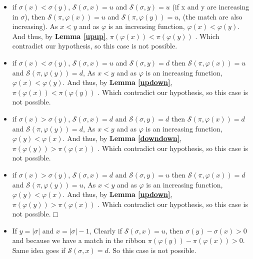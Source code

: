 \documentclass[12pt, a4paper]{article}
\newcommand{\ptext}{\pi}
\newcommand{\pmotif}{\sigma}
\newcommand{\dstep}{d}
\newcommand{\ustep}{u}
\begin{document}
		\begin{itemize}		
			\item if $\pmotif(x)<\pmotif(y)$, 
			$\mathcal{S}(\pmotif,x)=\ustep$ 
			and $\mathcal{S}(\pmotif,y)=\ustep$
			(if x and y are increasing in $\pmotif$),
			then $\mathcal{S}(\ptext,\varphi(x))=\ustep$ and $\mathcal{S}(\ptext,\varphi(y))=\ustep$,
			(the match are also increasing).
			As $x<y$ and as $\varphi$ is an increasing function, 
			$\varphi(x) < \varphi(y)$.
			And thus, by \textbf{Lemma \ref{upup}},
			$\ptext(\varphi(x)) < \ptext(\varphi(y))$ .
			Which contradict our hypothesis,
			so this case is not possible.
		
			\item if $\pmotif(x)<\pmotif(y)$, 
			$\mathcal{S}(\pmotif,x)=\ustep$ 
			and $\mathcal{S}(\pmotif,y)=\dstep$
			then $\mathcal{S}(\ptext,\varphi(x))=\ustep$ and $\mathcal{S}(\ptext,\varphi(y))=\dstep$,
			As $x<y$ and as $\varphi$ is an increasing function, 
			$\varphi(x) < \varphi(y)$.
			And thus, by \textbf{Lemma \ref{updown}},
			$\ptext(\varphi(x)) < \ptext(\varphi(y))$ .
			Which contradict our hypothesis,
			so this case is not possible.			

			\item if $\pmotif(x)>\pmotif(y)$, 
			$\mathcal{S}(\pmotif,x)=\dstep$ 
			and $\mathcal{S}(\pmotif,y)=\dstep$
			then $\mathcal{S}(\ptext,\varphi(x))=\dstep$ and $\mathcal{S}(\ptext,\varphi(y))=\dstep$,
			As $x<y$ and as $\varphi$ is an increasing function, 
			$\varphi(y) < \varphi(x)$.
			And thus, by \textbf{Lemma \ref{downdown}},
			$\ptext(\varphi(y)) > \ptext(\varphi(x))$ .
			Which contradict our hypothesis,
			so this case is not possible.
			
			\item if $\pmotif(x)>\pmotif(y)$, 
			$\mathcal{S}(\pmotif,x)=\dstep$ 
			and $\mathcal{S}(\pmotif,y)=\ustep$
			then $\mathcal{S}(\ptext,\varphi(x))=\dstep$ and $\mathcal{S}(\ptext,\varphi(y))=\ustep$,
			As $x<y$ and as $\varphi$ is an increasing function, 
			$\varphi(y) < \varphi(x)$.
			And thus, by \textbf{Lemma \ref{updown}},
			$\ptext(\varphi(y)) > \ptext(\varphi(x))$ .
			Which contradict our hypothesis,
			so this case is not possible.$\Box$
			
			\item If $y = |\pmotif|$ and $x=|\pmotif|-1$,
			Clearly if $\mathcal{S}(\pmotif,x)=\ustep$,
			then $\pmotif(y)-\pmotif(x)>0$ 
			and because we have a match in the ribbon
			$\ptext(\varphi(y))-\ptext(\varphi(x))>0$.
			Same idea goes if $\mathcal{S}(\pmotif,x)=\dstep$.
			So this case is not possible.
			

\end{itemize}
\end{document}
